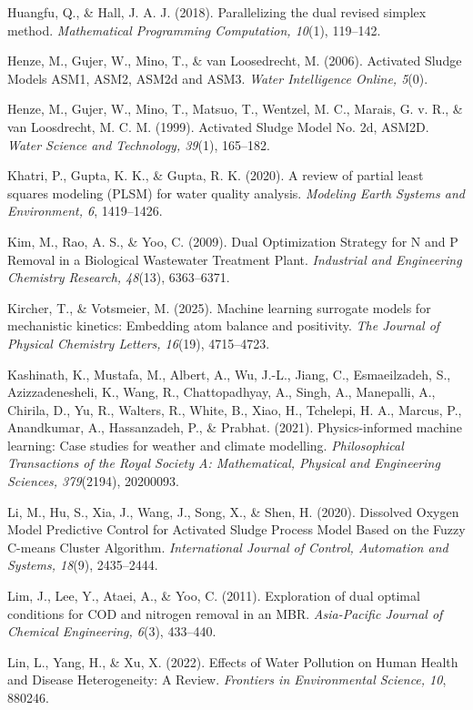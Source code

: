 \documentclass[a4paper,fleqn]{cas-sc}
\begin{document}
\noindent Huangfu, Q., \& Hall, J. A. J. (2018). Parallelizing the dual revised simplex method. \textit{Mathematical Programming Computation, 10}(1), 119--142.

\noindent Henze, M., Gujer, W., Mino, T., \& van Loosedrecht, M. (2006). Activated Sludge Models ASM1, ASM2, ASM2d and ASM3. \textit{Water Intelligence Online, 5}(0).

\noindent Henze, M., Gujer, W., Mino, T., Matsuo, T., Wentzel, M. C., Marais, G. v. R., \& van Loosdrecht, M. C. M. (1999). Activated Sludge Model No. 2d, ASM2D. \textit{Water Science and Technology, 39}(1), 165--182.

\noindent Khatri, P., Gupta, K. K., \& Gupta, R. K. (2020). A review of partial least squares modeling (PLSM) for water quality analysis. \textit{Modeling Earth Systems and Environment, 6}, 1419--1426.

\noindent Kim, M., Rao, A. S., \& Yoo, C. (2009). Dual Optimization Strategy for N and P Removal in a Biological Wastewater Treatment Plant. \textit{Industrial and Engineering Chemistry Research, 48}(13), 6363--6371.

\noindent Kircher, T., \& Votsmeier, M. (2025). Machine learning surrogate models for mechanistic kinetics: Embedding atom balance and positivity. \textit{The Journal of Physical Chemistry Letters, 16}(19), 4715--4723.

\noindent Kashinath, K., Mustafa, M., Albert, A., Wu, J.-L., Jiang, C., Esmaeilzadeh, S., Azizzadenesheli, K., Wang, R., Chattopadhyay, A., Singh, A., Manepalli, A., Chirila, D., Yu, R., Walters, R., White, B., Xiao, H., Tchelepi, H. A., Marcus, P., Anandkumar, A., Hassanzadeh, P., \& Prabhat. (2021). Physics-informed machine learning: Case studies for weather and climate modelling. \textit{Philosophical Transactions of the Royal Society A: Mathematical, Physical and Engineering Sciences, 379}(2194), 20200093.

\noindent Li, M., Hu, S., Xia, J., Wang, J., Song, X., \& Shen, H. (2020). Dissolved Oxygen Model Predictive Control for Activated Sludge Process Model Based on the Fuzzy C-means Cluster Algorithm. \textit{International Journal of Control, Automation and Systems, 18}(9), 2435--2444.

\noindent Lim, J., Lee, Y., Ataei, A., \& Yoo, C. (2011). Exploration of dual optimal conditions for COD and nitrogen removal in an MBR. \textit{Asia-Pacific Journal of Chemical Engineering, 6}(3), 433--440.

\noindent Lin, L., Yang, H., \& Xu, X. (2022). Effects of Water Pollution on Human Health and Disease Heterogeneity: A Review. \textit{Frontiers in Environmental Science, 10}, 880246.
\end{document}

